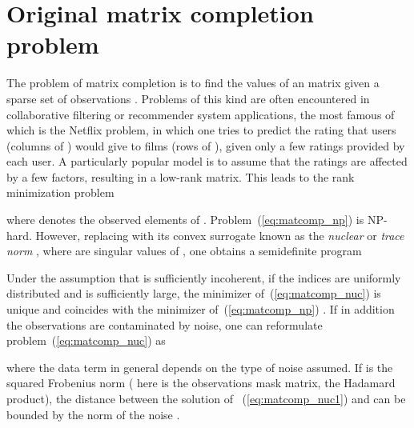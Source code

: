 \documentclass{article}
\begin{document}
\vspace{-0.1cm}
\section{Original matrix completion problem}
\label{secMatCom}
\vspace{-0.2cm}
The problem of matrix completion is to find the values of an  matrix  given a sparse set  of observations . 
Problems of this kind are often encountered in collaborative filtering or recommender system applications, the most famous of which is the Netflix problem, in which one tries to predict the rating that  users (columns of ) would give to  films (rows of ), given only a few ratings provided by each user. 
A particularly popular model is to assume that the ratings are affected by a few factors, resulting in a low-rank matrix. 
This leads to the rank minimization problem 
\vspace{-0.1cm} 

where  denotes the observed elements of . Problem~(\ref{eq:matcomp_np}) is NP-hard. However, replacing  with its convex surrogate known as the {\em nuclear} or {\em trace norm} \cite{srebro2004maximum}  , where  are singular values of , one obtains a semidefinite program 
\vspace{-0.1cm}

Under the assumption that  is sufficiently incoherent, if the indices  are uniformly distributed and  is sufficiently large, the minimizer of~(\ref{eq:matcomp_nuc}) is unique and coincides with the minimizer of~(\ref{eq:matcomp_np}) \cite{candes2009exact,recht2011simpler}. If in addition the observations are contaminated by noise, one can reformulate problem~(\ref{eq:matcomp_nuc}) as 
\vspace{-0.3cm}

where the data term  in general depends on the type of noise assumed. If  is the squared Frobenius norm  ( here is the observations mask matrix,  the Hadamard product), the distance between the solution of ~(\ref{eq:matcomp_nuc1}) and  can be bounded by the norm of the noise \cite{candes2010matrix}. 
\end{document}
